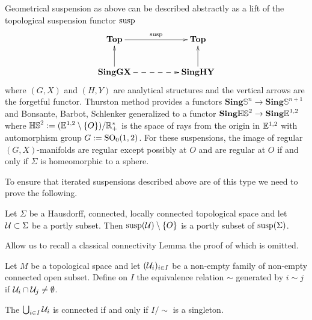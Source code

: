  
Geometrical suspension as above can be described abstractly as a lift of the topological suspension functor $\mathrm{susp}$
 $$\xymatrix{ \mathbf{Top} \ar[rr]^\susp&& \mathbf{Top} \\
 \mathbf{SingGX} \ar[u]\ar@{-->}[rr]&& \mathbf{SingHY}\ar[u] 
 }$$ 
 where $(G,X)$ and $(H,Y)$ are analytical structures and the vertical arrows are the forgetful functor. Thurston method provides a functors $\mathbf{Sing}\boldsymbol{\mathbb S}^n \rightarrow \mathbf{Sing}\boldsymbol{\mathbb S}^{n+1}$ and Bonsante, Barbot, Schlenker \cite{Particules_1} generalized to a functor
  $\mathbf{Sing}\boldsymbol{\mathbb {HS}}^2 \rightarrow \mathbf{Sing}\boldsymbol{\mathbb{E}}^{1,2}$ where $\mathbb{HS}^2:=({\mathbb E}^{1,2}_{}\setminus\{O\})/\mathbb R_+^*$ is the space of rays from the origin in ${\mathbb E}^{1,2}_{}$ with automorphism group $G:=\mathrm{SO}_0(1,2)$.
For these suspensions, the image of regular $(G,X)$-manifolds are regular except possibly at $O$ and are regular at $O$ if and only if $\Sigma$ is homeomorphic to a sphere.  

To ensure that iterated suspensions described above are of this type we need to prove the following.
 
 
\begin{prop} \label{prop:susp_portly} Let $\Sigma$ be a Hausdorff, connected, locally connected topological space and let $\mathcal{U}\subset \Sigma$ be a portly subset. 
Then $\mathrm{susp}(\mathcal{U})\setminus \{O\}$ is a portly subset of $\mathrm{susp}(\Sigma)$.
\end{prop}
 Allow us to recall a classical connectivity Lemma the proof of which is omitted.
\begin{lem}\label{lem:connected_union}
 Let $M$ be a topological space and let $(\mathcal{U}_i)_{i\in I}$ be a non-empty family of non-empty connected open subset. Define on $I$ the equivalence relation $\sim$ generated by $i\sim j$ if $\mathcal{U}_i\cap \mathcal{U}_j \neq \emptyset$.
 
 The $\bigcup_{i\in I} \mathcal{U}_i$ is connected if and only if $I/\sim$ is a singleton.
 
\end{lem}

